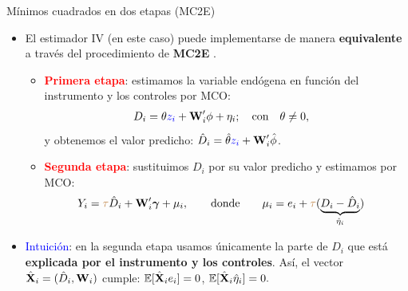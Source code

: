 \documentclass[10pt, xcolor=dvipsnames]{beamer}
\begin{document}
\begin{frame}{Mínimos cuadrados en dos etapas (MC2E)}\label{DIAP:MC2E}
\begin{itemize}
    \item El estimador IV (en este caso) puede implementarse de manera \textbf{equivalente} a través del procedimiento de \textbf{MC2E} \hyperlink{DIAP:DEMOS-MC2E}{{}}. %
    \vspace{1em}
    \begin{itemize}
        \item \textcolor{red}{\textbf{Primera etapa}}: estimamos la variable endógena en función del instrumento y los controles por MCO: 
        \begin{align*}
        \begin{split}
            D_i &= \theta \textcolor{blue}{z_i} + \textbf{W}'_i \mathbf{\phi} + \eta_{i}; \hspace{1em} \text{con} \hspace{1em} \theta \neq 0,
        \end{split}
        \end{align*}
        y obtenemos el valor predicho: \(\hat{D}_i = \hat{\theta} \textcolor{blue}{z_i} + \textbf{W}'_i \hat{\phi} \). %
        \vspace{1em} 
        \item \textcolor{red}{\textbf{Segunda etapa}}: sustituimos $D_i$ por su valor predicho y estimamos por MCO:
        \begin{align*}
        \begin{split}
        Y_{i} &= \textcolor{brown}{\tau} \hat{D}_i + \textbf{W}'_{i}\boldsymbol{\gamma} + \mu_{i}, \qquad \text{donde} \qquad \mu_i = e_i + \textcolor{brown}{\tau} (\underbrace{D_i - \hat{D}_i}_{\hat{\eta}_i})
        \end{split}
        \end{align*}        
        \end{itemize}
    \item \textcolor{blue}{Intuición}: en la segunda etapa usamos únicamente la parte de $D_i$ que está \textbf{explicada por el instrumento y los controles}. Así, el vector $\hat{\textbf{X}}_i = (\hat{D}_i, \textbf{W}_i)$ cumple: \(\operatorname{\mathbb{E}}[\hat{\textbf{X}}_i e_i] = 0\), \(\operatorname{\mathbb{E}}[\hat{\textbf{X}}_i \hat{\eta}_i] = 0.\)
\end{itemize}    
\end{frame}
\end{document}
